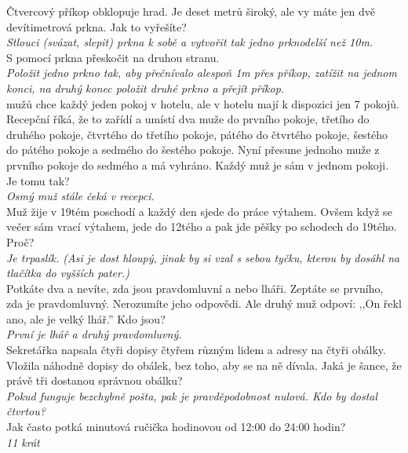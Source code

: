 \begin{multicols}{\value{columnsgames}}
\noindent
Čtvercový příkop obklopuje hrad. Je deset metrů široký, ale 
vy máte jen dvě devítimetrová prkna. Jak to vyřešíte?\\[1 mm]
{\sl Stlouci (svázat, slepit) prkna k sobě a vytvořit tak jedno
prknodelší než 10m.}\\

\noindent
S pomocí prkna přeskočit na druhou stranu.\\[1 mm]
{\sl Položit jedno prkno tak, aby přečnívalo alespoň 1m přes
příkop, zatížit na jednom konci, na druhý konec položit druhé
prkno a přejít příkop.}\\

 mužů chce každý jeden pokoj v hotelu, ale v hotelu mají 
k dispozici jen 7 pokojů. Recepční říká, že to zařídí a umístí 
dva muže do prvního pokoje, třetího do druhého pokoje, čtvrtého 
do třetího pokoje, pátého do čtvrtého pokoje, šestého do pátého 
pokoje a sedmého do šestého pokoje. Nyní přesune jednoho muže 
z prvního pokoje do sedmého a má vyhráno. Každý muž je sám v 
jednom pokoji. Je tomu tak?\\[1 mm]
{\sl Osmý muž stále čeká v recepci.}\\

\noindent
Muž žije v 19tém poschodí a každý den sjede do práce výtahem. 
Ovšem když se večer sám vrací výtahem, jede do 12tého a pak jde 
pěšky po schodech do 19tého. Proč?\\[1 mm]
{\sl Je trpaslík. (Asi je dost hloupý, jinak by si vzal s sebou 
tyčku, kterou by dosáhl na tlačítka do vyšších pater.)}\\

\noindent
Potkáte dva a nevíte, zda jsou pravdomluvní a nebo lháři. 
Zeptáte se prvního, zda je pravdomluvný. Nerozumíte jeho odpovědi. 
Ale druhý muž odpoví: ,,On řekl ano, ale je velký lhář.'' Kdo 
jsou?\\[1 mm]
{\sl První je lhář a druhý pravdomluvný.}\\

\noindent
Sekretářka napsala čtyři dopisy čtyřem různým lidem a adresy 
na čtyři obálky. Vložila náhodně dopisy do obálek, bez toho, 
aby se na ně dívala. Jaká je šance, že právě tři dostanou správnou
obálku?\\[1 mm]
{\sl Pokud funguje bezchybně pošta, pak je pravděpodobnost nulová.
Kdo by dostal čtvrtou?}\\

\noindent
Jak často potká minutová ručička hodinovou od 12:00 do 24:00 
hodin?\\[1 mm]
{\sl 11 krát}\\


\end{multicols}
